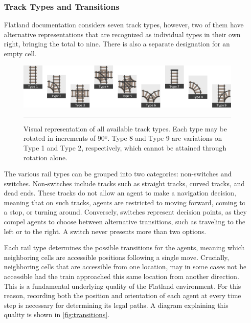 \documentclass[11pt]{article}
\begin{document}
\subsubsection{Track Types and Transitions}
\label{sec:Track}
Flatland documentation \citep{baeiegljmomonyspwaaggo21a} considers seven track types, however, two of them have alternative representations that are recognized as individual types in their own right, bringing the total to nine.  There is also a separate designation for an empty cell.

\begin{figure}[t]
\centering
\includegraphics[width=\textwidth]{tracks}
\caption{Visual representation of all available track types.  Each type may be rotated in increments of 90º.  Type 8 and Type 9 are variations on Type 1 and Type 2, respectively, which cannot be attained through rotation alone.}
\label{fig:tracks}

\begin{center}
{\color{lightgray} \rule{\linewidth}{0.15mm}}
\end{center}

\end{figure}

The various rail types can be grouped into two categories: non-switches and switches.  Non-switches include tracks such as straight tracks, curved tracks, and dead ends.  These tracks do not allow an agent to make a navigation decision, meaning that on such tracks, agents are restricted to moving forward, coming to a stop, or turning around.  Conversely, switches represent decision points, as they compel agents to choose between alternative transitions, such as traveling to the left or to the right.  A switch never presents more than two options.

Each rail type determines the possible transitions for the agents, meaning which neighboring cells are accessible positions following a single move.  Crucially, neighboring cells that are accessible from one location, may in some cases not be accessible had the train approached this same location from another direction.  This is a fundamental underlying quality of the Flatland environment.  For this reason, recording both the position and orientation of each agent at every time step is necessary for determining its legal paths.  A diagram explaining this quality is shown in \autoref{fig:transitions}.
\end{document}
